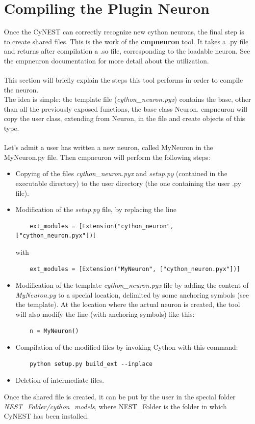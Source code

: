 \documentclass{article}
\begin{document}
\section{Compiling the Plugin Neuron}
Once the CyNEST can correctly recognize new cython neurons, the final step is to create shared files. This is the work of the \textbf{cmpneuron} tool. It takes a .py file and returns after compilation a .so file, corresponding to the loadable neuron. See the cmpneuron documentation for more detail about the utilization.\\ \\
This section will briefly explain the steps this tool performs in order to compile the neuron.\\
The idea is simple: the template file (\emph{cython\_neuron.pyx}) contains the base, other than all the previously exposed functions, the base class Neuron. cmpneuron will copy the user class, extending from Neuron, in the file and create objects of this type.\\ \\ 
Let's admit a user has written a new neuron, called MyNeuron in the MyNeuron.py file. Then cmpneuron will perform the following steps:
\begin{itemize}
\item Copying of the files \emph{cython\_neuron.pyx} and \emph{setup.py} (contained in the executable directory) to the user directory (the one containing the user .py file).
\item Modification of the \emph{setup.py} file, by replacing the line
\begin{verbatim}
    ext_modules = [Extension("cython_neuron", ["cython_neuron.pyx"])]
\end{verbatim}
with
\begin{verbatim}
    ext_modules = [Extension("MyNeuron", ["cython_neuron.pyx"])]
\end{verbatim}
\item Modification of the template \emph{cython\_neuron.pyx} file by adding the content of \emph{MyNeuron.py} to a special location, delimited by some anchoring symbols (see the template). At the location where the actual neuron is created, the tool will also modify the line (with anchoring symbols) like this:
\begin{verbatim}
    n = MyNeuron()
\end{verbatim}
\item Compilation of the modified files by invoking Cython with this command:
\begin{verbatim}
    python setup.py build_ext --inplace
\end{verbatim}
\item Deletion of intermediate files.
\end{itemize}
Once the shared file is created, it can be put by the user in the special folder \emph{NEST\_Folder/cython\_models}, where NEST\_Folder is the folder in which CyNEST has been installed.
\end{document}
